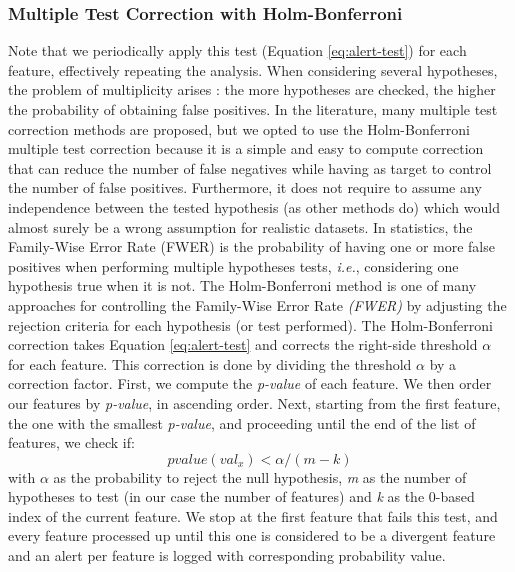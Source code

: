 \documentclass[sigconf]{acmart}
\begin{document}
\subsubsection{Multiple Test Correction with Holm-Bonferroni} \label{sec:multi-test}
Note that we periodically apply this test (Equation \ref{eq:alert-test}) for each feature, effectively repeating the analysis. When considering several hypotheses, the problem of multiplicity arises \cite{MultiTestProblem-Pubmed, MultiTestProblem-Dickhaus2014, MultiTestProblem-Miller1966, multiple-test-correction-geoffrey}: the more hypotheses are checked, the higher the probability of obtaining false positives. In the literature, many multiple test correction methods are proposed, but we opted to use the Holm-Bonferroni \cite{HolmBonferroni} multiple test correction because it is a simple and easy to compute correction that can reduce the number of false negatives while having as target to control the number of false positives. Furthermore, it does not require to assume any independence between the tested hypothesis (as other methods do) which would almost surely be a wrong assumption for realistic datasets. In statistics, the Family-Wise Error Rate (FWER) \cite{MultivariateMT, MultitestTamhane2018AdvancesIP} is the probability of having one or more false positives when performing multiple hypotheses tests, \textit{i.e.}, considering one hypothesis true when it is not. The Holm-Bonferroni method is one of many approaches for controlling the Family-Wise Error Rate \textit{(FWER)} by adjusting the rejection criteria for each hypothesis (or test performed). The Holm-Bonferroni correction takes Equation \ref{eq:alert-test} and corrects the right-side threshold $\alpha$ for each feature. This correction is done by dividing the threshold $\alpha$ by a correction factor. First, we compute the \textit{p-value} of each feature. We then order our features by \textit{p-value}, in ascending order. Next, starting from the first feature, the one with the smallest \textit{p-value}, and proceeding until the end of the list of features, we check if:
\begin{equation}
    pvalue(val_x) < \alpha / (m - k)
    \label{eq:corrected-pvalue}
\end{equation}
with $\alpha$ as the probability to reject the null hypothesis, \textit{m} as the number of hypotheses to test (in our case the number of features) and \textit{k} as the 0-based index of the current feature. We stop at the first feature that fails this test, and every feature processed up until this one is considered to be a divergent feature and an alert per feature is logged with corresponding probability value.
\end{document}
